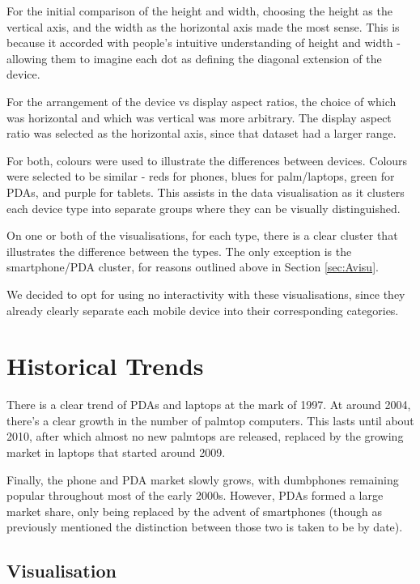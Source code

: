 \documentclass[conference]{IEEEtran}
\begin{document}
For the initial comparison of the height and width, choosing the height as the vertical axis, and the width as the horizontal axis made the most sense. This is because it accorded with people's intuitive understanding of height and width - allowing them to imagine each dot as defining the diagonal extension of the device.

For the arrangement of the device vs display aspect ratios, the choice of which was horizontal and which was vertical was more arbitrary. The display aspect ratio was selected as the horizontal axis, since that dataset had a larger range. 

For both, colours were used to illustrate the differences between devices. Colours were selected to be similar - reds for phones, blues for palm/laptops, green for PDAs, and purple for tablets. This assists in the data visualisation as it clusters each device type into separate groups where they can be visually distinguished.

On one or both of the visualisations, for each type, there is a clear cluster that illustrates the difference between the types. The only exception is the smartphone/PDA cluster, for reasons outlined above in Section \ref{sec:Avisu}.

We decided to opt for using no interactivity with these visualisations, since they already clearly separate each mobile device into their corresponding categories.

\section{Historical Trends}

There is a clear trend of PDAs and laptops at the mark of 1997. At around 2004, there's a clear growth in the number of palmtop computers. This lasts until about 2010, after which almost no new palmtops are released, replaced by the growing market in laptops that started around 2009.

Finally, the phone and PDA market slowly grows, with dumbphones remaining popular throughout most of the early 2000s. However, PDAs formed a large market share, only being replaced by the advent of smartphones (though as previously mentioned the distinction between those two is taken to be by date).

\subsection{Visualisation}
\end{document}
